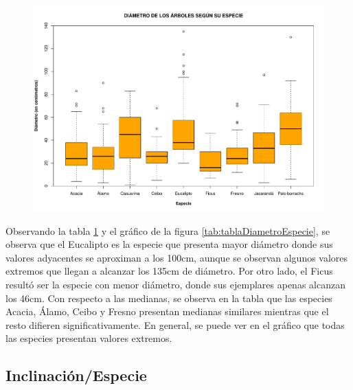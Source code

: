 \documentclass[11pt]{article}
\begin{document}
\begin{figure}[h!]
  \begin{center}
    \includegraphics[width=0.9\linewidth]{boxDiametroEspecie.pdf}
    \caption{}
    \label{fig:boxDiametroEspecie}
  \end{center}
\end{figure}

\begin{justify}
  Observando la tabla \ref{fig:boxDiametroEspecie} y el gráfico
  de la figura \ref{tab:tablaDiametroEspecie}, se observa que el Eucalipto es la
  especie que presenta mayor diámetro donde sus valores adyacentes se
  aproximan a los 100cm, aunque se observan algunos valores extremos que llegan
  a alcanzar los 135cm de diámetro. Por otro lado, el Ficus resultó ser la
  especie con menor diámetro, donde sus ejemplares apenas alcanzan los 46cm.
  Con respecto a las medianas, se observa en la tabla que las especies
  Acacia, Álamo, Ceibo y Fresno presentan medianas similares mientras que el resto
  difieren significativamente.
  En general, se puede ver en el gráfico que todas las especies presentan valores
  extremos.
\end{justify}


\newpage
\subsection{Inclinación/Especie}
\end{document}
